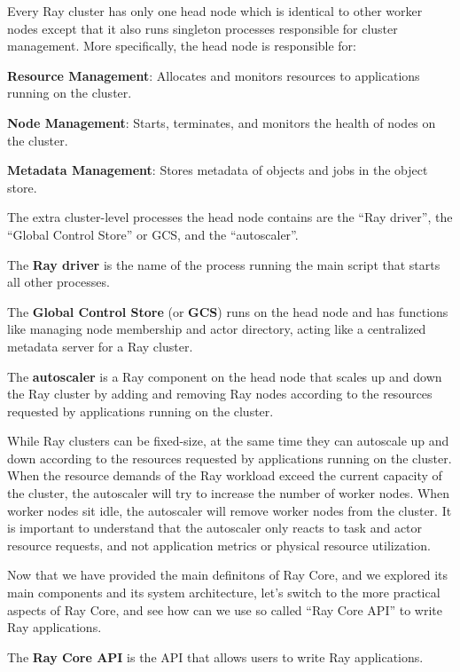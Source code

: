 Every Ray cluster has only one head node which is identical to other worker nodes except that it also runs singleton
processes responsible for cluster management. More specifically, the head node is responsible for:
\bit
\item \textbf{Resource Management}: Allocates and monitors resources to applications running on the cluster.
\item \textbf{Node Management}: Starts, terminates, and monitors the health of nodes on the cluster.
\item \textbf{Metadata Management}: Stores metadata of objects and jobs in the object store.
\eit

The extra cluster-level processes the head node contains are the ``Ray driver'', the ``Global Control Store'' or GCS,
and the ``autoscaler''.

The \textbf{Ray driver} is the name of the process running the main script that starts all other processes.
\ed

The \textbf{Global Control Store} (or \textbf{GCS}) runs on the head node and has functions like managing node
membership and actor directory, acting like a centralized metadata server for a Ray cluster.
\ed

\bd[Autoscaler]
The \textbf{autoscaler} is a Ray component on the head node that scales up and down the Ray cluster by adding and
removing Ray nodes according to the resources requested by applications running on the cluster.
\ed

While Ray clusters can be fixed-size, at the same time they can autoscale up and down according to the resources
requested by applications running on the cluster. When the resource demands of the Ray workload exceed the current
capacity of the cluster, the autoscaler will try to increase the number of worker nodes. When worker nodes sit idle,
the autoscaler will remove worker nodes from the cluster. It is important to understand that the autoscaler only
reacts to task and actor resource requests, and not application metrics or physical resource utilization.


Now that we have provided the main definitons of Ray Core, and we explored its main components and its system
architecture, let's switch to the more practical aspects of Ray Core, and see how can we use so called ``Ray Core API''
to write Ray applications.

The \textbf{Ray Core API} is the API that allows users to write Ray applications.
\ed


